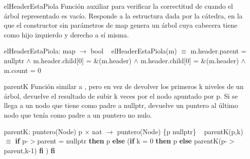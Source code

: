 \begin{DoxyParagraph}{el\+Header\+Esta\+Piola}
Función auxiliar para verificar la correctitud de  cuando el árbol representado es vacío. Responde a la estructura dada por la cátedra, en la que el constructor sin parámetros de map genera un árbol cuya cabecera tiene como hijo izquierdo y derecho a sí misma.

el\+Header\+Esta\+Piola\+: map $\to$ bool ~\newline
el\+Header\+Esta\+Piola(m) $\equiv$ m.\+header.\+parent = nullptr $\land$ m.\+header.\+child\mbox{[}0\mbox{]} = \&(m.\+header) $\land$ m.\+header.\+child\mbox{[}0\mbox{]} = \&(m.\+header) $\land$ m.\+count = 0


\end{DoxyParagraph}
\begin{DoxyParagraph}{parentK}
Función similar a , pero en vez de devolver los primeros k niveles de un árbol, devuelve el resultado de subir k veces por el nodo apuntado por p. Si se llega a un nodo que tiene como padre a nullptr, devuelve un puntero al último nodo que tenía como padre a un puntero no nulo.

parentK\+: puntero(\+Node) p $\times$ nat $\to$ puntero(\+Node) \{p  nullptr\} ~\newline
parent\+K(p,k) $\equiv$ {\bfseries if} p-\/$>$parent = nullptr {\bfseries then} p {\bfseries else} ({\bfseries if} k = 0 {\bfseries then} p {\bfseries else} parentK(p-\/$>$parent,k-\/1) {\bfseries fi} ) {\bfseries fi} 
\end{DoxyParagraph}
